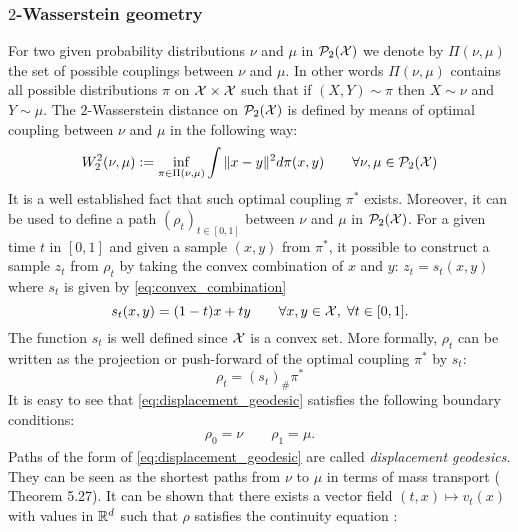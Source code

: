 \subsubsection{$2$-Wasserstein geometry}\label{subsec:wasserstein_flow}
For two given probability distributions $\nu$ and $\mu$ in $\mathcal{P}_2({{\mathcal X}})$ we denote by $\Pi(\nu,\mu)$ the set of possible couplings between $\nu$ and $\mu$. In other words $\Pi(\nu,\mu)$ contains all possible distributions $\pi$ on ${{\mathcal X}}\times {{\mathcal X}}$ such that if $(X,Y) \sim \pi $ then $X \sim \nu $ and $Y\sim \mu$. The $2$-Wasserstein distance on $\mathcal{P}_2({{\mathcal X}})$ is defined by means of optimal coupling between $\nu$ and $\mu$ in the following way:
\begin{align}\label{eq:wasserstein_2}
	W_2^2(\nu,\mu) := \inf_{\pi\in\Pi(\nu,\mu)} \int \Vert x - y\Vert^2 d\pi(x,y) \qquad \forall \nu, \mu\in \mathcal{P}_2({{\mathcal X}})
\end{align}
It is a well established fact that such optimal coupling $\pi^*$ exists. Moreover, it can be used to define a path $(\rho_t)_{t\in [0,1]}$ between $\nu$ and $\mu$ in $\mathcal{P}_2({{\mathcal X}})$. For a given time $t$ in $[0,1]$ and given a sample $(x,y)$ from $\pi^{*}$, it possible to construct a sample $z_t$ from $\rho_t$ by taking the convex combination of $x$ and $y$: $z_t = s_t(x,y)$ where $s_t$ is given by \cref{eq:convex_combination}
\begin{equation}\label{eq:convex_combination}
	s_t(x,y) = (1-t)x+ty \qquad \forall x,y\in {{\mathcal X}}, \; \forall t\in [0,1].
\end{equation}
The function $s_t$ is well defined since ${{\mathcal X}}$ is a convex set. More formally, $\rho_t$ can be written as the projection or push-forward of the optimal coupling $\pi^{*}$ by $s_t$:    
  \begin{equation}\label{eq:displacement_geodesic}
	\rho_t = (s_t)_{\#}\pi^{*}
\end{equation}
It is easy to see that \cref{eq:displacement_geodesic} satisfies the following boundary conditions:
\begin{align}\label{eq:boundary_conditions}
	\rho_0 = \nu \qquad \rho_1 = \mu.
\end{align}
Paths of the form of \cref{eq:displacement_geodesic} are called \textit{displacement geodesics}. They can be seen as the shortest paths from $\nu$ to $\mu$ in terms of mass transport (\cite{Santambrogio:2015} Theorem 5.27). It can be shown that there exists a vector field $(t,x)\mapsto v_t(x)$ with values in ${{\mathbb R}}^d$ such that $\rho$ satisfies the continuity equation  :
